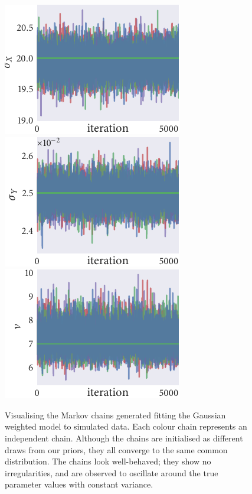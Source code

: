 \begin{figure}[tbp]
  \includegraphics{gauss/gauss_trace_sigma_X.pdf}%
  \includegraphics{gauss/gauss_trace_sigma_Y.pdf}%
  \includegraphics{gauss/gauss_trace_nu.pdf}
  \caption{Visualising the Markov chains generated fitting the Gaussian
    weighted model to simulated data. Each colour chain represents an independent
    chain. Although the chains are initialised as different draws from our
    priors, they all converge to the same common distribution. The chains look
    well-behaved; they show no irregularities, and are observed to oscillate
    around the true parameter values with constant variance.}
  \label{fig:gauss_trace}
\end{figure}%
